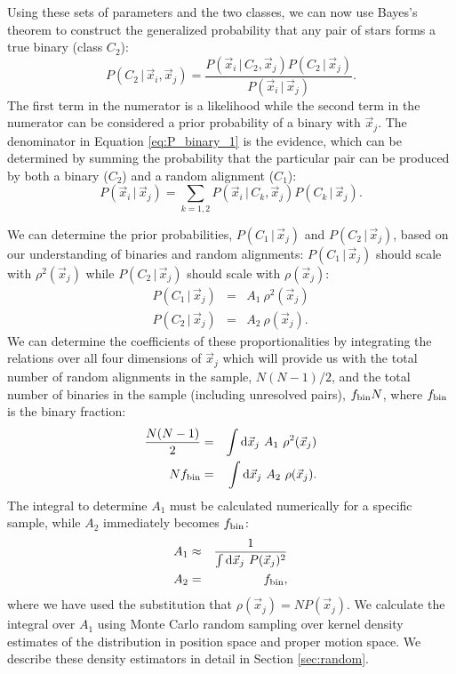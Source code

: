 \documentclass[usenatbib]{mnras}
\newcommand{\given}{\,|\,}
\newcommand{\dd}{\mathrm{d}}
\begin{document}
Using these sets of parameters and the two classes, we can now use Bayes's theorem to construct the generalized probability that any pair of stars forms a true binary (class $C_2$):
\begin{equation}
P(C_2 \given \vec{x}_i, \vec{x}_j) = \frac{P(\vec{x}_i \given C_2, \vec{x}_j) P(C_2 \given \vec{x}_j)}{P(
\vec{x}_i \given \vec{x}_j)}. \label{eq:P_binary_1}
\end{equation}
The first term in the numerator is a likelihood while the second term in the numerator can be considered a prior probability of a binary with $\vec{x}_j$. The denominator in Equation \ref{eq:P_binary_1} is the evidence, which can be determined by summing the probability that the particular pair can be produced by both a binary ($C_2$) and a random alignment ($C_1$):
\begin{equation}
P(\vec{x}_i \given \vec{x}_j) = \sum_{k=1,2} P(\vec{x}_i \given C_k, \vec{x}_j) P(C_k \given \vec{x}_j).
\end{equation}


We can determine the prior probabilities, $P(C_1 \given \vec{x}_j)$ and $P(C_2 \given \vec{x}_j)$, based on our understanding of binaries and random alignments: $P(C_1 \given \vec{x}_j)$ should scale with $\rho^2(\vec{x}_j)$ while $P(C_2 \given \vec{x}_j)$ should scale with $\rho(\vec{x}_j)$:
\begin{eqnarray}
P(C_1 \given \vec{x}_j) &=& A_1\ \rho^2(\vec{x}_j) \\
P(C_2 \given \vec{x}_j) &=& A_2\ \rho(\vec{x}_j).
\end{eqnarray}
We can determine the coefficients of these proportionalities by integrating the relations over all four dimensions of $\vec{x}_j$ which will provide us with the total number of random alignments in the sample, $N(N-1)/2$, and the total number of binaries in the sample (including unresolved pairs), $f_{\rm bin} N$, where $f_{\rm bin}$ is the binary fraction:
\begin{eqnarray}
\frac{N(N-1)}{2} &=& \int \dd \vec{x}_j\ A_1\ \rho^2(\vec{x}_j) \\
N f_{\rm bin} &=& \int \dd \vec{x}_j\ A_2\ \rho(\vec{x}_j).
\end{eqnarray}
The integral to determine $A_1$ must be calculated numerically for a specific sample, while $A_2$ immediately becomes $f_{\rm bin}$:
\begin{eqnarray}
A_1 &\approx& \frac{1}{\int \dd \vec{x}_j\ P(\vec{x}_j)^2} \\
A_2 &=& f_{\rm bin},
\end{eqnarray}
where we have used the substitution that $\rho(\vec{x}_j) = N P(\vec{x}_j)$. We calculate the integral over $A_1$ using Monte Carlo random sampling over kernel density estimates of the distribution in position space and proper motion space. We describe these density estimators in detail in Section \ref{sec:random}.
\end{document}
